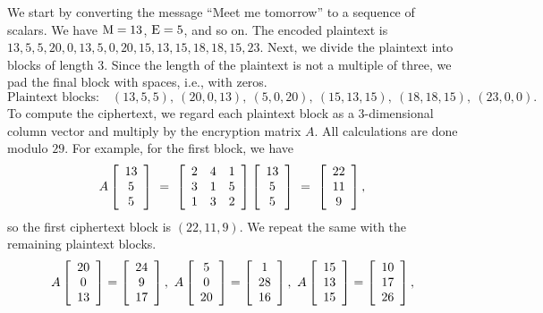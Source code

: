\documentclass{ximera}
\begin{document}
\begin{solution}
  We start by converting the message ``Meet me tomorrow'' to a sequence
  of scalars. We have $\qq{M}=13$, $\qq{E}=5$, and so on. The encoded
  plaintext is $13,5,5,20,0,13,5,0,20,15,13,15,18,18,15,23$. Next, we
  divide the plaintext into blocks of length 3. Since the length of
  the plaintext is not a multiple of three, we pad the final block
  with spaces, i.e., with zeros.
  \begin{equation*}
    \mbox{Plaintext blocks:}\quad
    (13,5,5),\
    (20,0,13),\
    (5,0,20),\
    (15,13,15),\
    (18,18,15),\
    (23,0,0).
  \end{equation*}
  To compute the ciphertext, we regard each plaintext block as a
  $3$-dimensional column vector and multiply by the encryption matrix
  $A$. All calculations are done modulo $29$. For example, for the
  first block, we have
  \begin{equation*}
    A \startmat{c} 13 \\ 5 \\ 5 \stopmat
    ~=~ \startmat{ccc}
      2 & 4 & 1 \\
      3 & 1 & 5 \\
      1 & 3 & 2 \\
    \stopmat
    \startmat{c} 13 \\ 5 \\ 5 \stopmat
    ~=~ \startmat{c} 22 \\ 11 \\ 9 \stopmat,
  \end{equation*}
  so the first ciphertext block is $(22,11,9)$. We repeat the same
  with the remaining plaintext blocks.
  \begin{align*}
    &A \startmat{c} 20 \\ 0 \\ 13 \stopmat
    = \startmat{c} 24 \\ 9 \\ 17 \stopmat,
    \quad
    A \startmat{c} 5 \\ 0 \\ 20 \stopmat
    = \startmat{c} 1 \\ 28 \\ 16 \stopmat,
    \quad
    A \startmat{c} 15 \\ 13 \\ 15 \stopmat
    = \startmat{c} 10 \\ 17 \\ 26 \stopmat,
    \\\\[-2ex]

\end{align*}
\end{solution}
\end{document}
